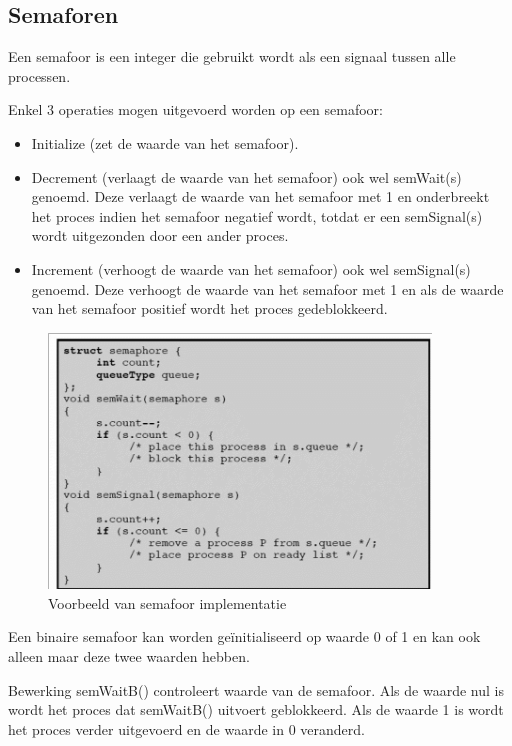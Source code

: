 \subsection{Semaforen}

Een semafoor is een integer die gebruikt wordt als een signaal tussen alle processen. 

Enkel 3 operaties mogen uitgevoerd worden op een semafoor:

\begin{itemize}
\item Initialize (zet de waarde van het semafoor).
\item Decrement (verlaagt de waarde van het semafoor) ook wel semWait(s) genoemd. Deze verlaagt de waarde van het semafoor met 1 en onderbreekt het proces indien het semafoor negatief wordt, totdat er een semSignal(s) wordt uitgezonden door een ander proces.
\item Increment (verhoogt de waarde van het semafoor) ook wel semSignal(s) genoemd. Deze verhoogt de waarde van het semafoor met 1 en als de waarde van het semafoor positief wordt het proces gedeblokkeerd.
\end{itemize}
\begin{figure}[htp]
    \centering
            \includegraphics[width=4in]{img/semafoor.png}
        \caption{Voorbeeld van semafoor implementatie}
    \label{fig:Voorbeeld van semafoor implementatie}
\end{figure}

Een binaire semafoor kan worden geïnitialiseerd op waarde 0 of 1 en kan ook alleen maar deze twee waarden hebben.

Bewerking semWaitB() controleert waarde van de semafoor. Als de waarde nul is wordt het proces dat semWaitB() uitvoert geblokkeerd. Als de waarde 1 is wordt het proces verder uitgevoerd en de waarde in 0 veranderd.

